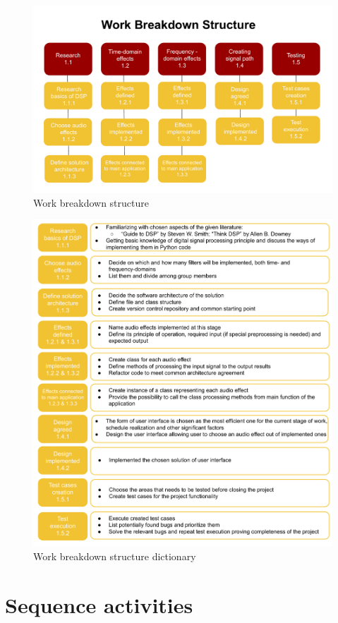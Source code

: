 \documentclass[12pt]{article}
\begin{document}
	\begin{figure}[H]
		\includegraphics[width=1.2\textwidth, center]{WBS}
		\caption{Work breakdown structure}
	\end{figure}
	\begin{figure}[H]
		\includegraphics[width=1.2\textwidth, center]{WBS dictionary}
		\caption{Work breakdown structure dictionary}
	\end{figure}

\section{Sequence activities}
\end{document}
